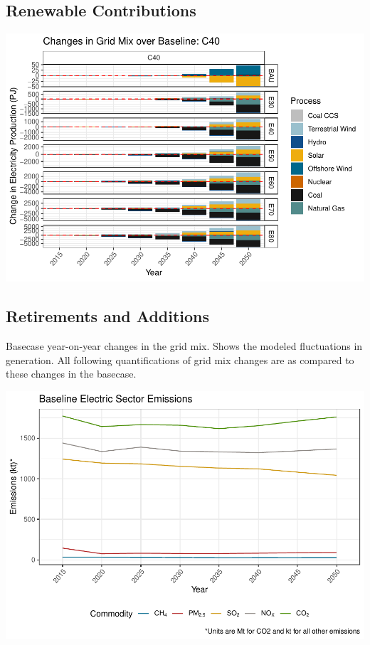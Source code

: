 \documentclass[]{article}
\begin{document}
\hypertarget{renewable-contributions}{%
\subsection{Renewable Contributions}\label{renewable-contributions}}

\includegraphics{osw_Report_files/figure-latex/unnamed-chunk-53-1.pdf}

\hypertarget{retirements-and-additions}{%
\subsection{Retirements and Additions}\label{retirements-and-additions}}

Basecase year-on-year changes in the grid mix. Shows the modeled
fluctuations in generation. All following quantifications of grid mix
changes are as compared to these changes in the basecase.

\includegraphics{osw_Report_files/figure-latex/unnamed-chunk-54-1.pdf}
\end{document}
